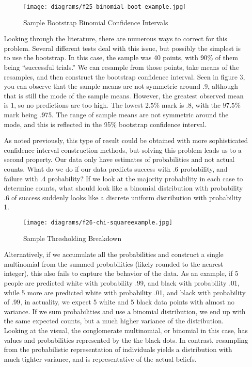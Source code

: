 \begin{wrapfigure}{r}{2in}
\texttt{[image: diagrams/f25-binomial-boot-example.jpg]}
\caption{Sample Bootstrap Binomial Confidence Intervals}
\label{fig:figure2s}
\end{wrapfigure}

\par Looking through the literature, there are numerous ways to correct for this problem.  Several different tests deal with this issue, but possibly the simplest is to use the bootstrap.  In this case, the sample was 40 points, with 90\% of them being “successful trials.”  We can resample from those points, take means of the resamples, and then construct the bootstrap confidence interval.  Seen in figure 3, you can observe that the sample means are not symmetric around .9, although that is still the mode of the sample means.  However, the greatest observed mean is 1, so no predictions are too high.  The lowest 2.5\% mark is .8, with the 97.5\% mark being .975.  The range of sample means are not symmetric around the mode, and this is reflected in the 95\% bootstrap confidence interval.

\par As noted previously, this type of result could be obtained with more sophisticated confidence interval construction methods, but solving this problem leads us to a second property.  Our data only have estimates of probabilities and not actual counts.  What do we do if our data predicts success with .6 probability, and failure with .4 probability?  If we look at the majority probability in each case to determine counts, what should look like a binomial distribution with probability .6 of success suddenly looks like a discrete uniform distribution with probability 1.

\begin{wrapfigure}{r}{2in}
\texttt{[image: diagrams/f26-chi-squareexample.jpg]}
\caption{Sample Thresholding Breakdown}
\label{fig:figure26}
\end{wrapfigure}

\par Alternatively, if we accumulate all the probabilities and construct a single multinomial from the summed probabilities (likely rounded to the nearest integer), this also fails to capture the behavior of the data.  As an example, if 5 people are predicted white with probability .99, and black with probability .01, while 5 more are predicted white with probability .01, and black with probability of .99, in actuality, we expect 5 white and 5 black data points with almost no variance.  If we sum probabilities and use a binomial distribution, we end up with the same expected counts, but a much higher variance of the distribution.  Looking at the visual, the conglomerate multinomial, or binomial in this case, has values and probabilities represented by the the black dots.  In contrast, resampling from the probabilistic representation of individuals yields a distribution with much tighter variance, and is representative of the actual beliefs.

